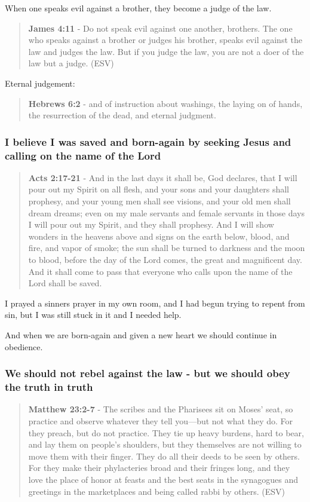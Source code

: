 \documentclass[11pt]{article}
\begin{document}
When one speaks evil against a brother, they become a judge of the law.

\begin{quote}
\textbf{James 4:11} - Do not speak evil against one another, brothers. The one who speaks against a brother or judges his brother, speaks evil against the law and judges the law. But if you judge the law, you are not a doer of the law but a judge. (ESV)
\end{quote}

Eternal judgement:

\begin{quote}
\textbf{Hebrews 6:2} - and of instruction about washings, the laying on of hands, the resurrection of the dead, and eternal judgment.
\end{quote}

\subsubsection{I believe I was saved and born-again by seeking Jesus and calling on the name of the Lord}
\label{sec:org1055e07}

\begin{quote}
\textbf{Acts 2:17-21} - And in the last days it shall be, God declares, that I will pour out my Spirit on all flesh, and your sons and your daughters shall prophesy, and your young men shall see visions, and your old men shall dream dreams; even on my male servants and female servants in those days I will pour out my Spirit, and they shall prophesy. And I will show wonders in the heavens above and signs on the earth below, blood, and fire, and vapor of smoke; the sun shall be turned to darkness and the moon to blood, before the day of the Lord comes, the great and magnificent day. And it shall come to pass that everyone who calls upon the name of the Lord shall be saved.
\end{quote}

I prayed a sinners prayer in my own room, and I had begun trying to repent from sin, but I was still stuck in it and I needed help.

And when we are born-again and given a new heart we should continue in obedience.

\subsubsection{We should not rebel against the law - but we should obey the truth in truth}
\label{sec:org6b41e50}
\begin{quote}
\textbf{Matthew 23:2-7} - The scribes and the Pharisees sit on Moses' seat, so practice and observe whatever they tell you—but not what they do. For they preach, but do not practice. They tie up heavy burdens, hard to bear, and lay them on people's shoulders, but they themselves are not willing to move them with their finger. They do all their deeds to be seen by others. For they make their phylacteries broad and their fringes long, and they love the place of honor at feasts and the best seats in the synagogues and greetings in the marketplaces and being called rabbi by others. (ESV)
\end{quote}
\end{document}
